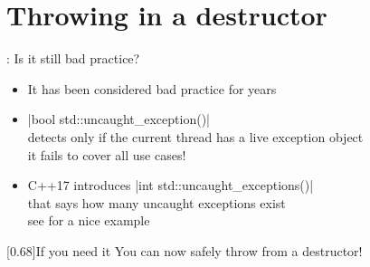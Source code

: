 \section{Throwing in a destructor}
\begin{frame}[fragile]{\insertsectionhead: Is it still bad practice?}
    \begin{itemize}
        \item It has been considered bad practice for years\\
        \then {}
        \item \CPP|bool std::uncaught_exception()|\\
        detects only if the current thread has a live exception object\\
        \then it fails to cover all use cases! 
        \item C++17 introduces \CPP|int std::uncaught_exceptions()|\\
        that says how many uncaught exceptions exist\\
        \then see  for a nice example
    \end{itemize}
    \begin{varblock}{}[0.68\textwidth]{If you need it}
        You can now safely throw from a destructor!
    \end{varblock}
\end{frame}

